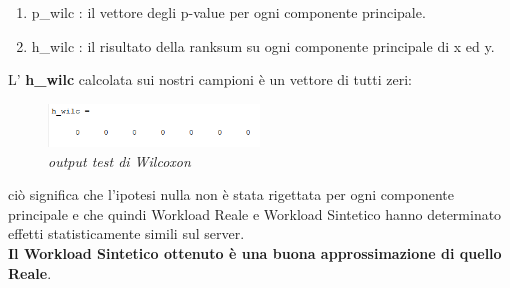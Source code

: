 \begin{enumerate}
	\item p\_wilc : il vettore degli p-value per ogni componente principale.
	\item h\_wilc : il risultato della ranksum su ogni componente principale di x ed y. 
\end{enumerate}
L' \textbf{h\_wilc} calcolata sui nostri campioni è un vettore di tutti zeri:
\begin{figure}[H]
	\centering
	\includegraphics[width=0.5\textwidth]{img/hw3/h_wilc.png}
	\caption{\textit{output test di Wilcoxon}}
\end{figure}
ciò significa che l'ipotesi nulla non è stata rigettata per ogni componente principale e che quindi Workload Reale e Workload Sintetico hanno determinato effetti statisticamente simili sul server.
\\
\textbf{Il Workload Sintetico ottenuto è una buona approssimazione di quello Reale}.